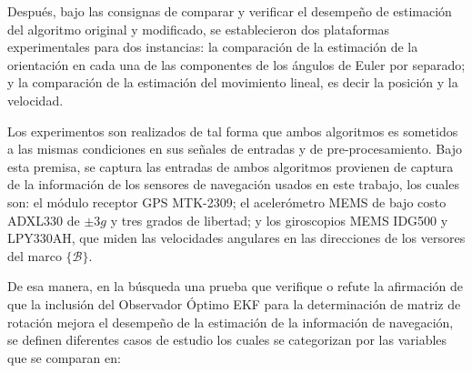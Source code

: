 \documentclass[conference]{IEEEtran}
\newcommand{\marco}[1]{\{\mathcal{#1}\}}
\begin{document}
Después, bajo las consignas de comparar y verificar el desempeño de estimación del algoritmo original y modificado, se establecieron dos plataformas experimentales para dos instancias: la comparación de la estimación de la orientación en cada una de las componentes de los ángulos de Euler por separado; y la comparación de la estimación del movimiento lineal, es decir la posición y la velocidad.\par
Los experimentos son realizados de tal forma que ambos algoritmos es sometidos a las mismas condiciones en sus señales de entradas y de pre-procesamiento. Bajo esta premisa, se captura las entradas de ambos algoritmos provienen de captura de la información de los sensores de navegación usados en este trabajo, los cuales son: el módulo receptor GPS MTK-2309; el acelerómetro MEMS de bajo costo ADXL330 de $\pm3g$ y tres grados de libertad; y los giroscopios MEMS IDG500 y LPY330AH, que miden las velocidades angulares en las direcciones de los versores del marco $\marco{B}$. \par
De esa manera, en la búsqueda una prueba que verifique o refute la afirmación de que la inclusión del Observador Óptimo EKF para la determinación de matriz de rotación mejora el desempeño de la estimación de la información de navegación, se definen diferentes casos de estudio los cuales se categorizan por las variables que se comparan en: 
\end{document}
